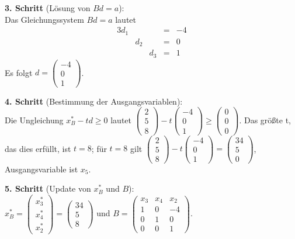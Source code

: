 \documentclass[10pt,a4paper,oneside,ngerman,numbers=noenddot]{scrartcl}
\begin{document}
		\textbf{3. Schritt} (Lösung von $Bd = a$):\\
		Das Gleichungssystem $Bd = a$ lautet
		\begin{alignat*}{3}
			d_{1} & & &=& -4 \\
			& d_{2} & &=& 0 \\
			& & d_{3} &=& 1
		\end{alignat*}
		Es folgt $d = \begin{pmatrix}-4 \\ 0 \\ 1 \end{pmatrix}$.
		
		\textbf{4. Schritt} (Bestimmung der Ausgangsvariablen):\\
		Die Ungleichung $x_{B}^{*} - td \geq 0$ lautet $\begin{pmatrix} 2 \\ 5 \\ 8\end{pmatrix} - t \begin{pmatrix}-4 \\ 0 \\ 1 \end{pmatrix} \geq \begin{pmatrix} 0 \\ 0 \\ 0 \end{pmatrix}$. Das größte t, das dies erfüllt, ist $t = 8$; für $t = 8$ gilt $\begin{pmatrix} 2 \\ 5 \\ 8\end{pmatrix} - t \begin{pmatrix}-4 \\ 0 \\ 1 \end{pmatrix} = \begin{pmatrix} 34 \\ 5 \\ 0 \end{pmatrix}$, Ausgangsvariable ist $x_{5}$.
		
		\textbf{5. Schritt} (Update von $x_{B}^{*}$ und $B$):\\
		$x_{B}^{*} = \begin{pmatrix} x_{3}^{*} \\ x_{4}^{*} \\ x_{2}^{*} \end{pmatrix} = \begin{pmatrix} 34 \\ 5 \\ 8 \end{pmatrix}$ und $B = \begin{pmatrix} x_{3} & x_{4} & x_{2} \\ 1 & 0 & -4 \\ 0 & 1 & 0 \\ 0 & 0 & 1 \end{pmatrix}$.
		
\end{document}
